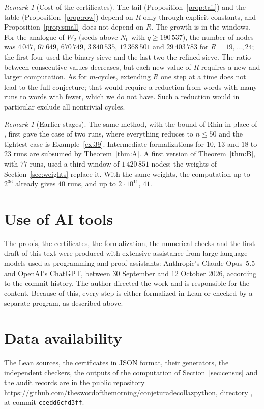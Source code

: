 \documentclass[11pt]{amsart}
\theoremstyle{definition}
\theoremstyle{remark}
\newtheorem{remark}[theorem]{Remark}
\begin{document}
\begin{remark}[Cost of the certificates]\label{rem:cost}
The tail (Proposition~\ref{prop:tail}) and the table (Proposition~\ref{prop:row}) depend on $R$ only through explicit constants, and Proposition~\ref{prop:small} does not depend on $R$. The growth is in the windows. For the analogue of $W_2$ (seeds above $N_0$ with $q\ge190\,537$), the number of nodes was $4\,047$, $67\,649$, $670\,749$, $3\,840\,535$, $12\,368\,501$ and $29\,403\,783$ for $R=19,\dots,24$; the first four used the binary sieve and the last two the refined sieve. The ratio between consecutive values decreases, but each new value of $R$ requires a new and larger computation. As for $m$-cycles, extending $R$ one step at a time does not lead to the full conjecture; that would require a reduction from words with many runs to words with fewer, which we do not have. Such a reduction would in particular exclude all nontrivial cycles.
\end{remark}

\begin{remark}[Earlier stages]
The same method, with the bound of Rhin \cite{Rhi87} in place of \cite{LMN95}, first gave the case of two runs, where everything reduces to $n\le50$ and the tightest case is Example~\ref{ex:39}. Intermediate formalizations for $10$, $13$ and $18$ to $23$ runs are subsumed by Theorem~\ref{thm:A}. A first version of Theorem~\ref{thm:B}, with $77$ runs, used a third window of $1\,420\,851$ nodes; the weights of Section~\ref{sec:weights} replace it. With the same weights, the computation up to $2^{36}$ already gives $40$ runs, and up to $2\cdot10^{11}$, $41$.
\end{remark}

\section*{Use of AI tools}
The proofs, the certificates, the formalization, the numerical checks and the first draft of this text were produced with extensive assistance from large language models used as programming and proof assistants: Anthropic's Claude Opus~5.5 and OpenAI's ChatGPT, between 30 September and 12 October 2026, according to the commit history. The author directed the work and is responsible for the content. Because of this, every step is either formalized in Lean or checked by a separate program, as described above.

\section*{Data availability}
The Lean sources, the certificates in JSON format, their generators, the independent checkers, the outputs of the computation of Section~\ref{sec:census} and the audit records are in the public repository \url{https://github.com/theswordofthemorning/conjeturadecollazpython}, directory , at commit \texttt{ccedd6cfd3ff}.
\end{document}
